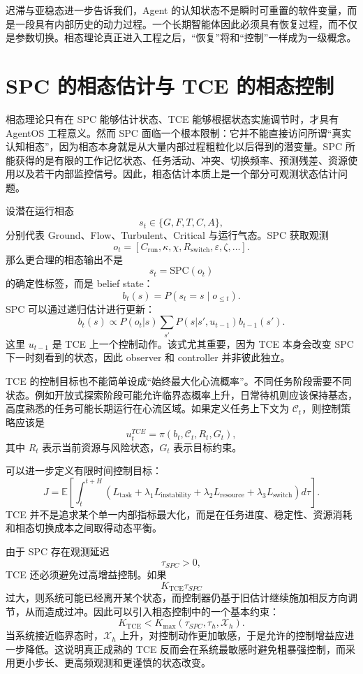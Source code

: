 迟滞与亚稳态进一步告诉我们，Agent 的认知状态不是瞬时可重置的软件变量，而是一段具有内部历史的动力过程。一个长期智能体因此必须具有恢复过程，而不仅是参数切换。相态理论真正进入工程之后，“恢复”将和“控制”一样成为一级概念。

\section{SPC 的相态估计与 TCE 的相态控制}

相态理论只有在 SPC 能够估计状态、TCE 能够根据状态实施调节时，才具有 AgentOS 工程意义。然而 SPC 面临一个根本限制：它并不能直接访问所谓“真实认知相态”，因为相态本身就是从大量内部过程粗粒化以后得到的潜变量。SPC 所能获得的是有限的工作记忆状态、任务活动、冲突、切换频率、预测残差、资源使用以及若干内部监控信号。因此，相态估计本质上是一个部分可观测状态估计问题。

设潜在运行相态
\[
s_t\in
\{
G,F,T,C,A
\},
\]
分别代表 Ground、Flow、Turbulent、Critical 与运行气态。SPC 获取观测
\[
o_t=
[
C_{\mathrm{run}},
\kappa,
\chi,
R_{\mathrm{switch}},
\varepsilon,
\zeta,\ldots].
\]
那么更合理的相态输出不是
\[
s_t=\mathrm{SPC}(o_t)
\]
的确定性标签，而是 belief state：
\[
b_t(s)
=
P(
s_t=s
\mid
o_{\leq t}
).
\]
SPC 可以通过递归估计进行更新：
\[
b_t(s)
\propto
P(o_t|s)
\sum_{s'}
P(s|s',u_{t-1})
b_{t-1}(s').
\]
这里 $u_{t-1}$ 是 TCE 上一个控制动作。该式尤其重要，因为 TCE 本身会改变 SPC 下一时刻看到的状态，因此 observer 和 controller 并非彼此独立。

TCE 的控制目标也不能简单设成“始终最大化心流概率”。不同任务阶段需要不同状态。例如开放式探索阶段可能允许临界态概率上升，日常待机则应该保持基态，高度熟悉的任务可能长期运行在心流区域。如果定义任务上下文为 $\mathcal C_t$，则控制策略应该是
\[
u_t^{TCE}
=
\pi
\left(
b_t,
\mathcal C_t,
R_t,
G_t
\right),
\]
其中 $R_t$ 表示当前资源与风险状态，$G_t$ 表示目标约束。

可以进一步定义有限时间控制目标：
\[
J
=
\mathbb E
\left[
\int_t^{t+H}
\left(
L_{\mathrm{task}}
+
\lambda_1 L_{\mathrm{instability}}
+
\lambda_2 L_{\mathrm{resource}}
+
\lambda_3 L_{\mathrm{switch}}
\right)d\tau
\right].
\]
TCE 并不是追求某个单一内部指标最大化，而是在任务进度、稳定性、资源消耗和相态切换成本之间取得动态平衡。

由于 SPC 存在观测延迟
\[
\tau_{SPC}>0,
\]
TCE 还必须避免过高增益控制。如果
\[
K_{\mathrm{TCE}}\tau_{SPC}
\]
过大，则系统可能已经离开某个状态，而控制器仍基于旧估计继续施加相反方向调节，从而造成过冲。因此可以引入相态控制中的一个基本约束：
\[
K_{\mathrm{TCE}}
<
K_{\max}
(\tau_{SPC},\tau_h,\mathcal X_h).
\]
当系统接近临界态时，$\mathcal X_h$ 上升，对控制动作更加敏感，于是允许的控制增益应进一步降低。这说明真正成熟的 TCE 反而会在系统最敏感时避免粗暴强控制，而采用更小步长、更高频观测和更谨慎的状态改变。

